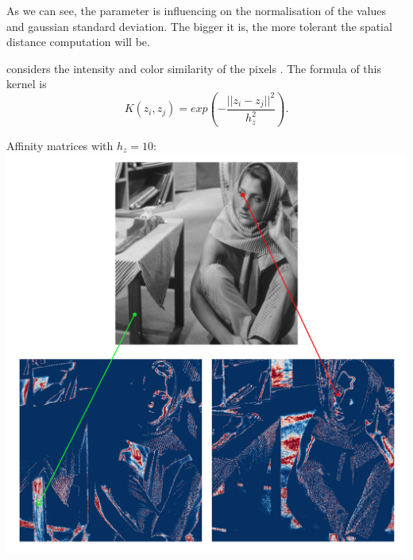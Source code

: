 \begin{description}[align=left]
  As we can see, the parameter is influencing on the normalisation of the values and gaussian standard deviation.
  The bigger it is, the more tolerant the spatial distance computation will be.

 \item [Photometric Gaussian Kernel] considers the intensity and color similarity of the pixels \cite{siam_slides_2016}.
  The formula of this kernel is
  \[K(z_i, z_j) = exp(-\frac{||z_i - z_j||^2}{h_z^2}).\]

  Affinity matrices with \(h_z = 10\): \\
  \includegraphics[width=\textwidth]{img/photometricAffinitySigma10.png}


\end{description}
